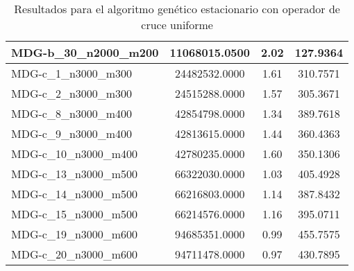 \documentclass[10pt,a4paper]{article}
\begin{document}
\begin{table}[H]
\begin{center}
\begin{tabular}{|l|c|c|c|}
					MDG-b\_30\_n2000\_m200 & 11068015.0500 & 2.02 & 127.9364 \\ \hline
					MDG-c\_1\_n3000\_m300 & 24482532.0000 & 1.61 & 310.7571 \\ \hline
					MDG-c\_2\_n3000\_m300 & 24515288.0000 & 1.57 & 305.3671 \\ \hline
					MDG-c\_8\_n3000\_m400 & 42854798.0000 & 1.34 & 389.7618 \\ \hline
					MDG-c\_9\_n3000\_m400 & 42813615.0000 & 1.44 & 360.4363 \\ \hline
					MDG-c\_10\_n3000\_m400 & 42780235.0000 & 1.60 & 350.1306 \\ \hline
					MDG-c\_13\_n3000\_m500 & 66322030.0000 & 1.03 & 405.4928 \\ \hline
					MDG-c\_14\_n3000\_m500 & 66216803.0000 & 1.14 & 387.8432 \\ \hline
					MDG-c\_15\_n3000\_m500 & 66214576.0000 & 1.16 & 395.0711 \\ \hline
					MDG-c\_19\_n3000\_m600 & 94685351.0000 & 0.99 & 455.7575 \\ \hline
					MDG-c\_20\_n3000\_m600 & 94711478.0000 & 0.97 & 430.7895 \\ \hline
				\end{tabular}
				\caption{Resultados para el algoritmo genético estacionario con operador de cruce uniforme}
				\label{}
				\end{center}
			\end{table}
			
\newpage
\end{document}
